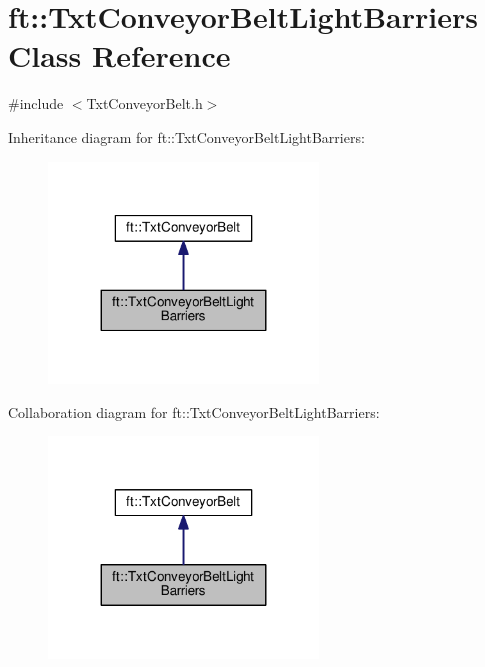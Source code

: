 \hypertarget{classft_1_1_txt_conveyor_belt_light_barriers}{}\section{ft\+:\+:Txt\+Conveyor\+Belt\+Light\+Barriers Class Reference}
\label{classft_1_1_txt_conveyor_belt_light_barriers}


{\ttfamily \#include $<$Txt\+Conveyor\+Belt.\+h$>$}



Inheritance diagram for ft\+:\+:Txt\+Conveyor\+Belt\+Light\+Barriers\+:
\nopagebreak
\begin{figure}[H]
\begin{center}
\leavevmode
\includegraphics[width=203pt]{classft_1_1_txt_conveyor_belt_light_barriers__inherit__graph}
\end{center}
\end{figure}


Collaboration diagram for ft\+:\+:Txt\+Conveyor\+Belt\+Light\+Barriers\+:
\nopagebreak
\begin{figure}[H]
\begin{center}
\leavevmode
\includegraphics[width=203pt]{classft_1_1_txt_conveyor_belt_light_barriers__coll__graph}
\end{center}
\end{figure}
